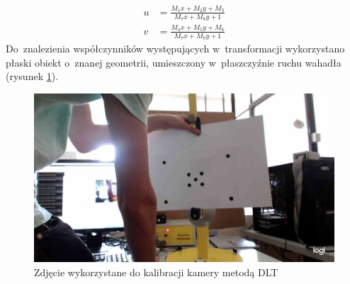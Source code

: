 \begin{align}
\label{eq:DLT_transform}
u &= \frac{M_1x + M_2y + M_3}{M_7x + M_8y + 1} \nonumber \\
v &= \frac{M_4x + M_5y + M_6}{M_7x + M_8y + 1}
\end{align}
Do~znalezienia współczynników występujących w~transformacji wykorzystano płaski obiekt o~znanej geometrii, umieszczony w~płaszczyźnie ruchu wahadła (rysunek \ref{fig:calibration}).
\begin{figure}
	\centering
	\includegraphics[width=0.8\linewidth]{calibration.jpg}
	\caption{Zdjęcie wykorzystane do kalibracji kamery metodą DLT}
	\label{fig:calibration}
\end{figure} \par
